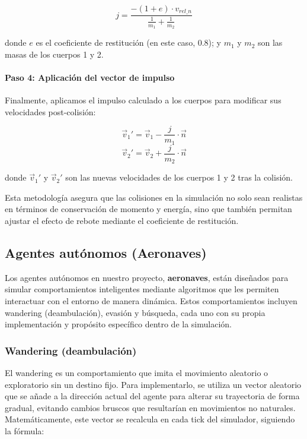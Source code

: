 \begin{equation}
\label{eq7}
    j = \frac{-(1 + e) \cdot v_{rel\_n}}{\frac{1}{m_1} + \frac{1}{m_2}}
\end{equation}

donde \(e\) es el coeficiente de restitución (en este caso, 0.8); y \(m_1\) y \(m_2\) son las masas de los cuerpos 1 y 2.

\paragraph{Paso 4: Aplicación del vector de impulso}
Finalmente, aplicamos el impulso calculado a los cuerpos para modificar sus velocidades post-colisión:

\begin{equation}
\label{eq8}
    \vec{v}_1' = \vec{v}_1 - \frac{j}{m_1} \cdot \vec{n}
\end{equation}
\begin{equation}
\label{eq9}
    \vec{v}_2' = \vec{v}_2 + \frac{j}{m_2} \cdot \vec{n}
\end{equation}

donde \(\vec{v}_1'\) y \(\vec{v}_2'\) son las nuevas velocidades de los cuerpos 1 y 2 tras la colisión.

Esta metodología asegura que las colisiones en la simulación no solo sean realistas en términos de conservación de momento y energía, sino que también permitan ajustar el efecto de rebote mediante el coeficiente de restitución.

\subsection{Agentes autónomos (Aeronaves)}

Los agentes autónomos en nuestro proyecto, \textbf{aeronaves}, están diseñados para simular comportamientos inteligentes mediante algoritmos que les permiten interactuar con el entorno de manera dinámica. Estos comportamientos incluyen wandering (deambulación), evasión y búsqueda, cada uno con su propia implementación y propósito específico dentro de la simulación.

\subsubsection{Wandering (deambulación)}
El wandering es un comportamiento que imita el movimiento aleatorio o exploratorio sin un destino fijo. Para implementarlo, se utiliza un vector aleatorio que se añade a la dirección actual del agente para alterar su trayectoria de forma gradual, evitando cambios bruscos que resultarían en movimientos no naturales. Matemáticamente, este vector se recalcula en cada tick del simulador, siguiendo la fórmula:

